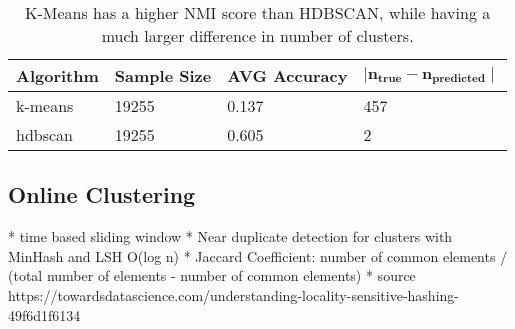 \begin{table}[h]
    \centering
    \begin{tabular}{|l|l|l|l|}
    \hline
    \textbf{Algorithm} & \textbf{Sample Size} & \textbf{AVG Accuracy}  & $\mathbf{ \mid n_{true} - n_{predicted} \mid }$ \\ \hline
    k-means & 19255 & 0.137 & 457 \\ \hline
    hdbscan & 19255 & 0.605 & 2 \\ \hline
    \end{tabular}
    \caption{K-Means has a higher NMI score than HDBSCAN, while having a much larger difference in number of clusters.}
    \label{tab:avg_predict_kmeans_example}
\end{table}

\subsection{Online Clustering}

* time based sliding window
* Near duplicate detection for clusters with MinHash and LSH O(log n)
* Jaccard Coefficient: number of common elements / (total number of elements - number of common elements)
* source https://towardsdatascience.com/understanding-locality-sensitive-hashing-49f6d1f6134

